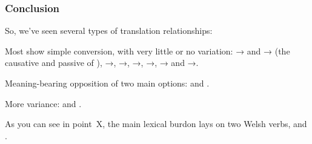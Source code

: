 \subsubsection{Conclusion}

\begin{paper}
	{\click} So, we’ve seen several types of translation relationships:
\end{paper}

\begin{hopoint}
	\begin{compactitem}
		\item Most show simple conversion, with very little or no variation:
			→ and → (the causative and passive of ), →, →, →, →, → and →.
		\item Meaning-bearing opposition of two main options:
			 and .
		\item More variance:
			 and .
	\end{compactitem}
\end{hopoint}

\begin{paper}
	As you can see in point~X, the main lexical burdon lays on two Welsh verbs,  and .
\end{paper}
